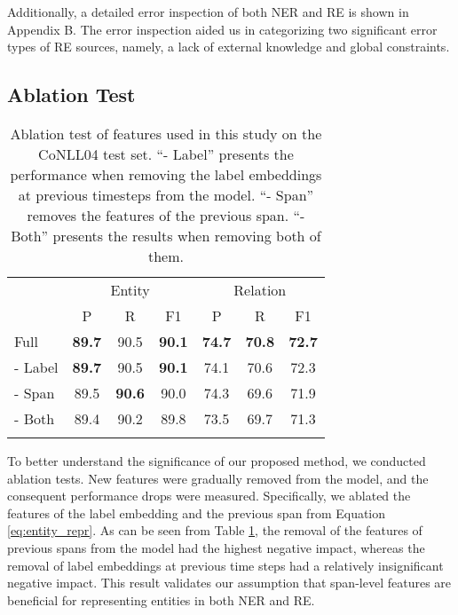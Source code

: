 \documentclass[11pt,a4paper]{article}
\begin{document}
Additionally, a detailed error inspection of both NER and RE is shown in Appendix B. The error inspection aided us in categorizing two significant error types of RE sources, namely, a lack of external knowledge and global constraints.

\subsection{Ablation Test}

\begin{table}[t]
    \centering 
    \small
    \begin{tabular}{lcccccc}
    \Xhline{3\arrayrulewidth} 
    \multirow{2}{*}{Model}  & \multicolumn{3}{c}{Entity} & \multicolumn{3}{c}{Relation}\\
        \cline{2-7}
        & P & R & F1 & P & R & F1\\
        \hline
        Full & \textbf{89.7} & 90.5 & \textbf{90.1} & \textbf{74.7} & \textbf{70.8} & \textbf{72.7} \\
        - Label & \textbf{89.7} & 90.5 & \textbf{90.1} & 74.1 & 70.6  & 72.3 \\
        - Span &   89.5 & \textbf{90.6} & 90.0 & 74.3 & 69.6 & 71.9\\
        - Both &  89.4 & 90.2 &89.8 & 73.5 & 69.7  & 71.3\\
    \Xhline{3\arrayrulewidth}
    \end{tabular}
    \caption{Ablation test of features used in this study on the CoNLL04 test set. ``- Label'' presents the performance when removing the label embeddings at previous timesteps from the model. ``- Span'' removes the features of the previous span. ``- Both'' presents the results when removing both of them.}
    \label{ablation}
\end{table}


To better understand the significance of our proposed method, we conducted ablation tests. New features were gradually removed from the model, and the consequent performance drops were measured.
Specifically, we ablated the features of the label embedding  and the previous span  from Equation \ref{eq:entity_repr}.
As can be seen from Table \ref{ablation}, the removal of the features of previous spans from the model had the highest negative impact, whereas the removal of label embeddings at previous time steps had a relatively insignificant negative impact. This result validates our assumption that span-level features are beneficial for representing entities in both NER and RE.
\end{document}
